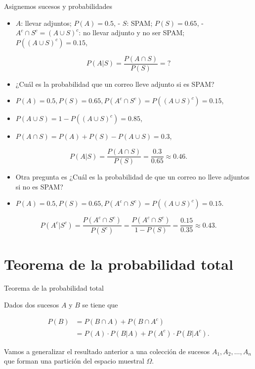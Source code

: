 \documentclass[
  letterpaper,
  DIV=11,
  numbers=noendperiod]{scrreprt}
\providecommand{\tightlist}{%
  \setlength{\itemsep}{0pt}\setlength{\parskip}{0pt}}\usepackage{longtable,booktabs,array}
\begin{document}
Asignemos sucesos y probabilidades

\begin{itemize}
\tightlist
\item
  \(A\): llevar adjuntos; \(P(A)=0.5\), - \(S\): SPAM; \(P(S)=0.65\), -
  \(A^c\cap S^c=(A\cup S)^c\): no llevar adjunto y no ser SPAM;
  \(P((A\cup S)^c)=0.15\),
\end{itemize}

\[P(A|S)=\dfrac{P(A\cap S)}{P(S)}=?\]

\begin{itemize}
\item
  ¿Cuál es la probabilidad que un correo lleve adjunto si es SPAM?
\item
  \(P(A)=0.5, P(S)=0.65, P(A^c\cap S^c)=P((A\cup S)^c)=0.15\),
\item
  \(P(A\cup S)=1-P((A\cup S)^c)=0.85\),
\item
  \(P(A\cap S)=P(A)+P(S)-P(A\cup S)=0.3\),
\end{itemize}

\[P(A|S)=\dfrac{P(A\cap S)}{P(S)}=\dfrac{0.3}{0.65}\approx 0.46.\]

\begin{itemize}
\item
  Otra pregunta es ¿Cuál es la probabilidad de que un correo no lleve
  adjuntos si no es SPAM?
\item
  \(P(A)=0.5, P(S)=0.65, P(A^c\cap S^c)=P((A\cup S)^c)=0.15.\)
\end{itemize}

\[P(A^c|S^c)=\dfrac{P(A^c\cap S^c)}{P(S^c)}=\dfrac{P(A^c\cap S^c)}{1-P(S)}=\dfrac{0.15}{0.35}\approx 0.43.\]

\section{Teorema de la probabilidad
total}\label{teorema-de-la-probabilidad-total}

Teorema de la probabilidad total

Dados dos sucesos \(A\) y \(B\) se tiene que

\[
\begin{array}{rl}
P(B)&= P(B\cap A) +P(B\cap A^c)\\
& =P(A)\cdot P(B|A)+ P(A^c)\cdot P(B|A^c).
\end{array}
\]

Vamos a generalizar el resultado anterior a una colección de sucesos
\(A_1,A_2,\ldots,A_n\) que forman una partición del espacio muestral
\(\Omega\).
\end{document}
